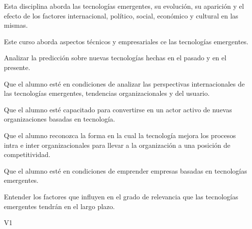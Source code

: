 \begin{syllabus}


\begin{justification}
	Esta disciplina aborda las tecnologías emergentes, su evolución, su aparición y el efecto de los factores internacional, político, social, económico y cultural en las mismas.
	
	Este curso aborda aspectos técnicos y empresariales ce las tecnologías emergentes.
	\end{justification}
	
	\begin{goals}
	\item Analizar la predicción sobre nuevas tecnologías hechas en el pasado y en el presente.
	\item Que el alumno esté en condiciones de analizar las perspectivas internacionales de las tecnologías emergentes, tendencias organizacionales y del usuario.
	\item Que el alumno esté capacitado para convertirse en un actor activo de nuevas organizaciones basadas en tecnología.
	\item Que el alumno reconozca la forma en la cual la tecnología mejora los procesos intra e inter organizacionales para llevar a la organización a una posición de competitividad.
	\item Que el alumno esté en condiciones de emprender empresas basadas en tecnologías emergentes.
	\item Entender los factores que influyen en el grado de relevancia que las tecnologías emergentes tendrán en el largo plazo.
	\end{goals}
	
	\begin{outcomes}{V1}
		\item {}
		\item {}
		\item {}
		\item {}
		\item {}
		\item {}
		\item {}
	\end{outcomes}
	

\end{syllabus}
